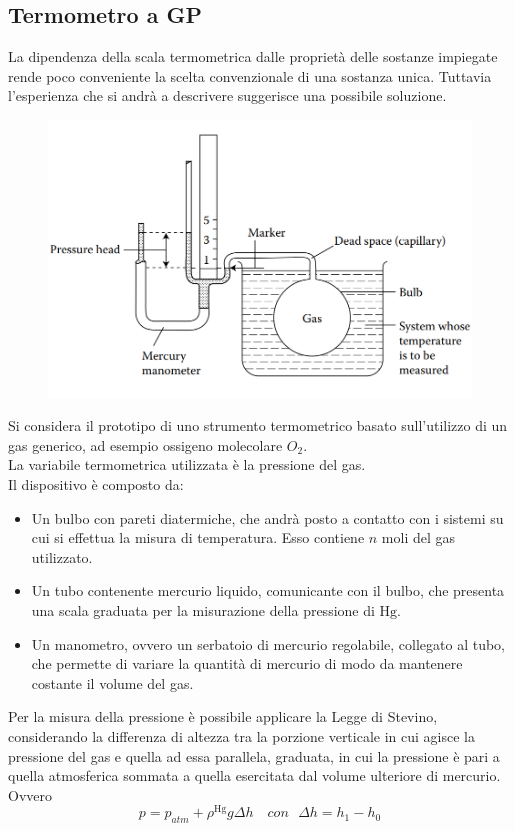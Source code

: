 \documentclass[10pt, oneside]{book}
\begin{document}
\subsection{Termometro a GP}
La dipendenza della scala termometrica dalle proprietà delle sostanze impiegate rende poco conveniente la scelta convenzionale di una sostanza unica. Tuttavia l'esperienza che si andrà a descrivere suggerisce una possibile soluzione.

\begin{figure}
\centering
\includegraphics[scale=0.6]{Termometro_gp.png}
\end{figure}

Si considera il prototipo di uno strumento termometrico basato sull'utilizzo di un gas generico, ad esempio ossigeno molecolare $O_2$.\\
La variabile termometrica utilizzata è la pressione del gas.\\
Il dispositivo è composto da:
\begin{itemize}
\item Un bulbo con pareti diatermiche, che andrà posto a contatto con i sistemi su cui si effettua la misura di temperatura. Esso contiene $n$ moli del gas utilizzato.
\item Un tubo contenente mercurio liquido, comunicante con il bulbo, che presenta una scala graduata per la misurazione della pressione di $\mathrm{Hg}$. 
\item Un manometro, ovvero un serbatoio di mercurio regolabile, collegato al tubo, che permette di variare la quantità di mercurio di modo da mantenere costante il volume del gas.
\end{itemize}
Per la misura della pressione è possibile applicare la Legge di Stevino, considerando la differenza di altezza tra la porzione verticale in cui agisce la pressione del gas e quella ad essa parallela, graduata, in cui la pressione è pari a quella atmosferica sommata a quella esercitata dal volume ulteriore di mercurio. Ovvero
\[p = p_{atm} + \rho^{\mathrm{Hg}} g\Delta h \quad con \enspace \, \Delta h = h_1 - h_0\]
\end{document}
